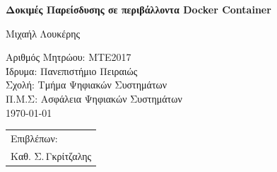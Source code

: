 \begin{titlepage}
    \vspace*{-3cm}
    
    \vspace*{5cm}
    \begin{center}
    \Huge\bfseries Δοκιμές Παρείσδυσης σε περιβάλλοντα \textlatin{Docker Container}
    
    \vspace*{2cm}
    \large 
     Μιχαήλ Λουκέρης
    \end{center}
    
    \enlargethispage{3cm}
    \vfill
    \parbox[t]{0.60\textwidth}{%
        Αριθμός Μητρώου: ΜΤΕ2017            \\
        Ίδρυμα: Πανεπιστήμιο Πειραιώς       \\
        Σχολή: Τμήμα Ψηφιακών Συστημάτων    \\
        Π.Μ.Σ: Ασφάλεια Ψηφιακών Συστημάτων \\

        \today
      }%
    \hfill
    \begin{tabular}[t]{l@{}}%
    Επιβλέπων:\\
      Καθ. Σ.\,Γκρίτζαλης
    \end{tabular}
    \end{titlepage}
    